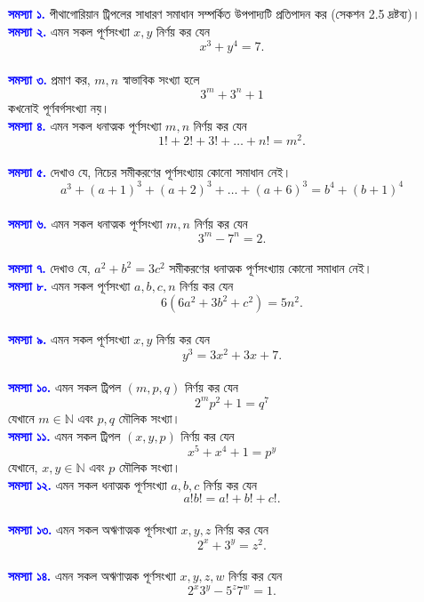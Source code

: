 \documentclass[11pt]{report}
\begin{document}
\begin{flushleft} 

\textbf{\textcolor{blue}{সমস্যা ১.}} পীথাগোরিয়ান ট্রিপলের সাধারণ সমাধান সম্পর্কিত উপপাদ্যটি প্রতিপাদন কর (সেকশন 2.5 দ্রষ্টব্য)।\\

\textbf{\textcolor{blue}{সমস্যা ২.}} এমন সকল পূর্ণসংখ্যা $x, y$ নির্ণয় কর যেন $$x^3+y^4=7.$$\\

\textbf{\textcolor{blue}{সমস্যা ৩.}} প্রমাণ কর, $m,n$ স্বাভাবিক সংখ্যা হলে $$3^m+3^n+1$$ কখনোই পূর্ণবর্গসংখ্যা নয়।\\

\textbf{\textcolor{blue}{সমস্যা ৪.}} এমন সকল ধনাত্মক পূর্ণসংখ্যা $m,n$ নির্ণয় কর যেন $$1!+2!+3!+\ldots+n!=m^2.$$\\

\textbf{\textcolor{blue}{সমস্যা ৫.}} দেখাও যে, নিচের সমীকরণের পূর্ণসংখ্যায় কোনো সমাধান নেই। $$a^3+(a+1)^3+(a+2)^3+\ldots+(a+6)^3 = b^4+(b+1)^4$$\\

\textbf{\textcolor{blue}{সমস্যা ৬.}} এমন সকল ধনাত্মক পূর্ণসংখ্যা $m,n$ নির্ণয় কর যেন $$3^m-7^n=2.$$\\

\textbf{\textcolor{blue}{সমস্যা ৭.}} দেখাও যে, $a^2+b^2=3c^2$ সমীকরণের ধনাত্মক পূর্ণসংখ্যায় কোনো সমাধান নেই।\\

\textbf{\textcolor{blue}{সমস্যা ৮.}} এমন সকল পূর্ণসংখ্যা $a,b,c,n$ নির্ণয় কর যেন $$6(6a^2+3b^2+c^2)=5n^2.$$\\

\textbf{\textcolor{blue}{সমস্যা ৯.}} এমন সকল পূর্ণসংখ্যা $x,y$ নির্ণয় কর যেন $$y^3=3x^2+3x+7.$$\\

\textbf{\textcolor{blue}{সমস্যা ১০.}} এমন সকল ট্রিপল $(m,p,q)$ নির্ণয় কর যেন $$2^mp^2+1=q^7$$ যেখানে $m \in \mathbb{N}$ এবং $p,q$ মৌলিক সংখ্যা।\\

\textbf{\textcolor{blue}{সমস্যা ১১.}} এমন সকল ট্রিপল $(x,y,p)$ নির্ণয় কর যেন $$x^5+x^4+1=p^y$$ যেখানে, $x,y \in \mathbb{N}$ এবং $p$ মৌলিক সংখ্যা।\\

\textbf{\textcolor{blue}{সমস্যা ১২.}} এমন সকল ধনাত্মক পূর্ণসংখ্যা $a,b,c$ নির্ণয় কর যেন $$a!b!=a!+b!+c!.$$\\

\textbf{\textcolor{blue}{সমস্যা ১৩.}} এমন সকল অঋণাত্মক পূর্ণসংখ্যা $x, y, z$ নির্ণয় কর যেন $$2^x + 3^y = z^2.$$\\

\textbf{\textcolor{blue}{সমস্যা ১৪.}} এমন সকল অঋণাত্মক পূর্ণসংখ্যা $x,y,z,w$ নির্ণয় কর যেন $$2^x3^y-5^z7^w=1.$$\\

\end{flushleft}
\end{document}
